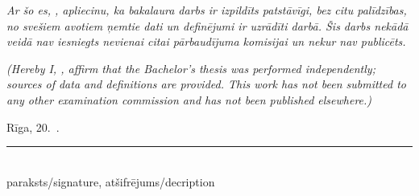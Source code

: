 \frontmatterpage
{}
\textit{Ar šo es, \underline{\hspace{4cm}}, apliecinu, ka bakalaura darbs ir izpildīts patstāvīgi, bez citu palīdzības, no svešiem avotiem ņemtie dati un definējumi ir uzrādīti darbā. Šis darbs nekādā veidā nav iesniegts nevienai citai pārbaudījuma komisijai un nekur nav publicēts.}

\vspace{12mm}
\noindent \textit{(Hereby I, \underline{\hspace{4cm}}, affirm that the Bachelor's thesis was performed independently; sources of data and definitions are provided. This work has not been submitted to any other examination commission and has not been published elsewhere.)}

\vspace{14mm}
\noindent Rīga, 20\underline{\hspace{1cm}}.\ \underline{\hspace{2.5cm}}.\hspace{1cm}\rule{5cm}{0.4pt}\\
\hspace*{7.1cm}\scriptsize paraksts/signature, atšifrējums/decription \hfill
